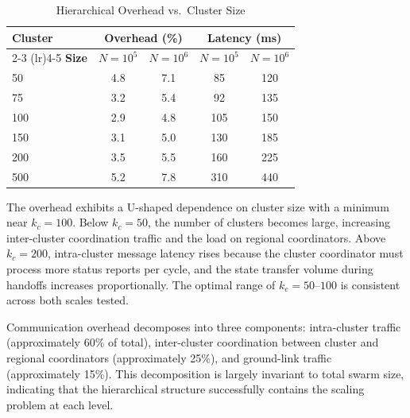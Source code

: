 \documentclass[journal]{IEEEtran}
\begin{document}
\begin{table}[t]
    \centering
    \caption{Hierarchical Overhead vs.\ Cluster Size}
    \label{tab:cluster_size}
    \begin{tabular}{@{}lcccc@{}}
        \toprule
        \textbf{Cluster} & \multicolumn{2}{c}{\textbf{Overhead (\%)}} & \multicolumn{2}{c}{\textbf{Latency (ms)}} \\
        \cmidrule(lr){2-3} \cmidrule(lr){4-5}
        \textbf{Size} & $N\!=\!10^5$ & $N\!=\!10^6$ & $N\!=\!10^5$ & $N\!=\!10^6$ \\
        \midrule
        50   & 4.8 & 7.1 & 85  & 120 \\
        75   & 3.2 & 5.4 & 92  & 135 \\
        100  & 2.9 & 4.8 & 105 & 150 \\
        150  & 3.1 & 5.0 & 130 & 185 \\
        200  & 3.5 & 5.5 & 160 & 225 \\
        500  & 5.2 & 7.8 & 310 & 440 \\
        \bottomrule
    \end{tabular}
\end{table}


The overhead exhibits a U-shaped dependence on cluster size with a minimum near $k_c = 100$. Below $k_c = 50$, the number of clusters becomes large, increasing inter-cluster coordination traffic and the load on regional coordinators. Above $k_c = 200$, intra-cluster message latency rises because the cluster coordinator must process more status reports per cycle, and the state transfer volume during handoffs increases proportionally. The optimal range of $k_c = 50$--$100$ is consistent across both scales tested.

Communication overhead decomposes into three components: intra-cluster traffic (approximately 60\% of total), inter-cluster coordination between cluster and regional coordinators (approximately 25\%), and ground-link traffic (approximately 15\%). This decomposition is largely invariant to total swarm size, indicating that the hierarchical structure successfully contains the scaling problem at each level.
\end{document}
